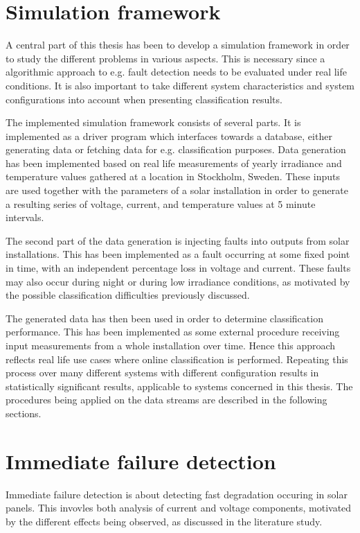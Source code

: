 \section{Simulation framework}
A central part of this thesis has been to develop a simulation framework in order to study the different problems in various aspects.
This is necessary since a algorithmic approach to e.g. fault detection needs to be evaluated under real life conditions.
It is also important to take different system characteristics and system configurations into account when presenting classification results.

The implemented simulation framework consists of several parts.
It is implemented as a driver program which interfaces towards a database, either generating data or fetching data for e.g. classification purposes.
Data generation has been implemented based on real life measurements of yearly irradiance and temperature values gathered at a location in Stockholm, Sweden.
These inputs are used together with the parameters of a solar installation in order to generate a resulting series of voltage, current, and temperature values at 5 minute intervals.

The second part of the data generation is injecting faults into outputs from solar installations.
This has been implemented as a fault occurring at some fixed point in time, with an independent percentage loss in voltage and current.
These faults may also occur during night or during low irradiance conditions, as motivated by the possible classification difficulties previously discussed.

The generated data has then been used in order to determine classification performance.
This has been implemented as some external procedure receiving input measurements from a whole installation over time.
Hence this approach reflects real life use cases where online classification is performed.
Repeating this process over many different systems with different configuration results in statistically significant results, applicable to systems concerned in this thesis.
The procedures being applied on the data streams are described in the following sections.

\section{Immediate failure detection}
Immediate failure detection is about detecting fast degradation occuring in solar panels.
This invovles both analysis of current and voltage components, motivated by the different effects being observed, as discussed in the literature study.

